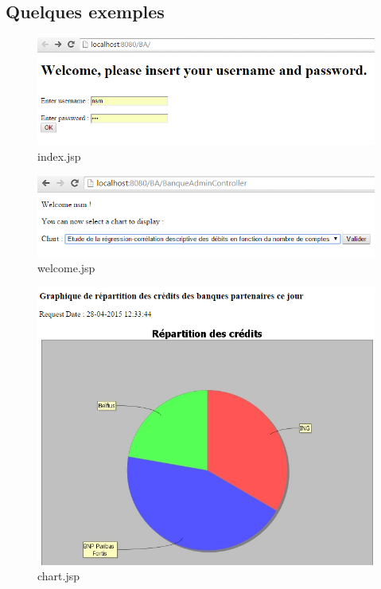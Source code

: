 \documentclass[11pt,fleqn]{article}
\begin{document}
\subsection{Quelques exemples}
\begin{figure}[H]
	\includegraphics[scale=0.4]{Images/log}
	\centering
	\caption{index.jsp}
\end{figure}
\begin{figure}[H]
	\includegraphics[scale=0.4]{Images/choix}
	\centering
	\caption{welcome.jsp}
\end{figure}
\begin{figure}[H]
	\includegraphics[scale=0.4]{Images/rep}
	\centering
	\caption{chart.jsp}
\end{figure}
\end{document}

